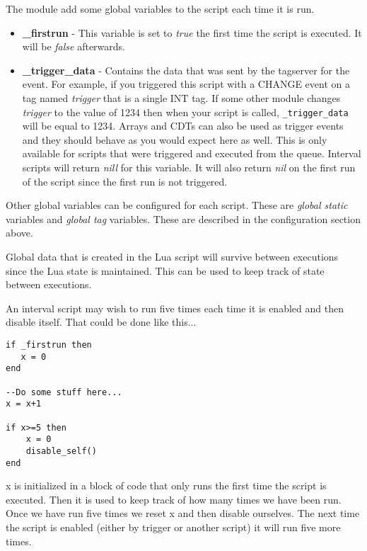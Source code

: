 The module add some global variables to the script each time it is run.

\begin{itemize}
    \item \textbf{\_firstrun} - This variable is set to \textit{true} the
    first time the script is executed.  It will be \textit{false} afterwards.

    \item \textbf{\_trigger\_data} - Contains the data that was sent by the
    tagserver for the event.  For example, if you triggered this
    script with a CHANGE event on a tag named \textit{trigger} that is a single
    INT tag.  If some other module changes \textit{trigger} to the value of
    1234 then when your script is called, \texttt{\_trigger\_data} will be
    equal to 1234.  Arrays and CDTs can also be used as trigger events and they
    should behave as you would expect here as well. This is only available for
    scripts that were triggered and executed from the queue.  Interval scripts
    will return \textit{nill} for this variable.  It will also return
    \textit{nil} on the first run of the script since the first run is not
    triggered.
\end{itemize}

Other global variables can be configured for each script.  These are
\textit{global static} variables and \textit{global tag} variables.  These
are described in the configuration section above.

Global data that is created in the Lua script will survive between executions
since the Lua state is maintained.  This can be used to keep track of state
between executions.

An interval script may wish to run five times each time it is enabled and
then disable itself.  That could be done like this...

\begin{verbatim}
if _firstrun then
   x = 0
end

--Do some stuff here...
x = x+1

if x>=5 then
    x = 0
    disable_self()
end
\end{verbatim}

x is initialized in a block of code that only runs the first time the script
is executed.  Then it is used to keep track of how many times we have been
run.  Once we have run five times we reset x and then disable ourselves.
The next time the script is enabled (either by trigger or another script)
it will run five more times.

